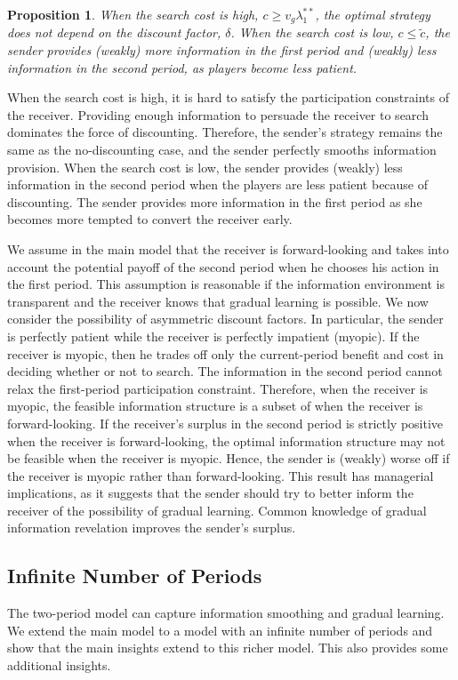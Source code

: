 \documentclass[11pt]{extarticle}
\newtheorem{proposition}{Proposition}
\begin{document}
\begin{proposition}\label{discounting}
	When the search cost is high, $c \geq v_g\lambda_1^{**}$, the optimal strategy does not depend on the discount factor, $\delta$. When the search cost is low, $c \leq \tilde{c}$, the sender provides (weakly) more information in the first period and (weakly) less information in the second period, as players become less patient. 
\end{proposition}
When the search cost is high, it is hard to satisfy the participation constraints of the receiver. Providing enough information to persuade the receiver to search dominates the force of discounting. Therefore, the sender's strategy remains the same as the no-discounting case, and the sender perfectly smooths information provision. When the search cost is low, the sender provides (weakly) less information in the second period when the players are less patient because of discounting. The sender provides more information in the first period as she becomes more tempted to convert the receiver early. 

We assume in the main model that the receiver is forward-looking and takes into account the potential payoff of the second period when he chooses his action in the first period. This assumption is reasonable if the information environment is transparent and the receiver knows that gradual learning is possible. We now consider the possibility of asymmetric discount factors. In particular, the sender is perfectly patient while the receiver is perfectly impatient (myopic). If the receiver is myopic, then he trades off only the current-period benefit and cost in deciding whether or not to search. The information in the second period cannot relax the first-period participation constraint. Therefore, when the receiver is myopic, the feasible information structure is a subset of when the receiver is forward-looking. If the receiver's surplus in the second period is strictly positive when the receiver is forward-looking, the optimal information structure may not be feasible when the receiver is myopic. Hence, the sender is (weakly) worse off if the receiver is myopic rather than forward-looking. This result has managerial implications, as it suggests that the sender should try to better inform the receiver of the possibility of gradual learning. Common knowledge of gradual information revelation improves the sender's surplus.



\subsection{Infinite Number of Periods}
The two-period model can capture information smoothing and gradual learning. We extend the main model to a model with an infinite number of periods and show that the main insights extend to this richer model. This also provides some additional insights.
\end{document}
